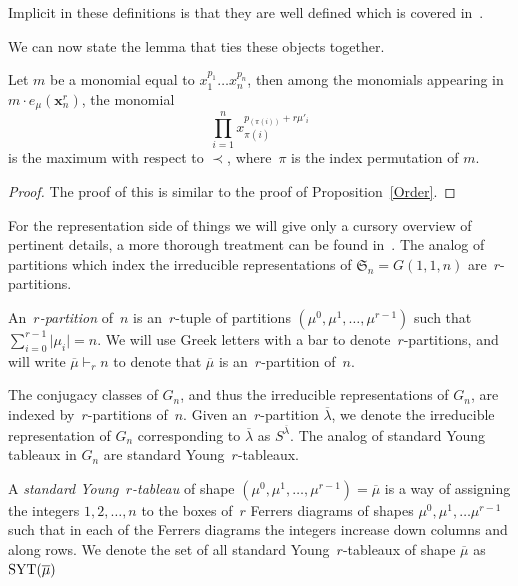 \documentclass[10pt]{article}
\begin{document}
	Implicit in these definitions is that they are well defined which is covered in~\cite{BB}.

	We can now state the lemma that ties these objects together.

\begin{lemm}

\label{Order2}

Let $m$ be a monomial equal to $x_1^{p_1}\ldots x_n^{p_n}$, then
among the monomials appearing in $m\cdot e_{\mu}(\mathbf{x}_n^r)$, the monomial
\begin{equation}
\prod_{i=1}^n 
x_{\pi(i)}^{p_{(\pi(i))}+r\mu'_i}
\end{equation}
is the maximum with respect to $\prec$, where~$\pi$ is the index permutation of 
$m$.
	\begin{proof}
	The proof of this is similar to the proof of Proposition~\ref{Order}.
	\end{proof}


\end{lemm}



For the representation side of things we will give only a cursory overview of pertinent details, a more thorough treatment can 
be found in~\cite{Stem}.
The analog of partitions which index the irreducible representations of $\mathfrak{S}_n=G(1,1,n)$ are~$r$-partitions.

	\begin{defi}
		An~\emph{$r$-partition} of~$n$ is an~$r$-tuple of partitions $(\mu^0,\mu^1,\ldots, \mu^{r-1})$ such that 
$\sum_{i=0}^{r-1} \vert \mu_i\vert=n$.
		We will use Greek letters with a bar to denote~$r$-partitions, and will write $\overline{\mu}\vdash_r n$ to denote 
that $\overline{\mu}$ is an~$r$-partition of~$n$.

	\end{defi}

The conjugacy classes of $G_n$, and thus the irreducible representations of $G_n$, are indexed by~$r$-partitions of~$n$. 
Given an~$r$-partition $\overline{\lambda}$, we denote the irreducible representation of $G_n$ corresponding to 
$\overline{\lambda}$ as $S^{\overline{\lambda}}$. The analog of standard Young tableaux in $G_n$ are standard Young~$r$-tableaux.

	\begin{defi}
		A \emph{standard Young~$r$-tableau} of shape $(\mu^0,\mu^1,\ldots, \mu^{r-1})=\overline{\mu}$ is a way of assigning 
the integers $1,2,\ldots, n$ to the boxes of~$r$ Ferrers diagrams of shapes $\mu^0, \mu^1,\ldots \mu^{r-1}$ such that 
in each of the Ferrers diagrams the integers increase down columns and along rows. We denote the set of all standard 
Young~$r$-tableaux of shape $\overline{\mu}$ as $\operatorname{SYT} (\overline{\mu})$

	\end{defi}
\end{document}
